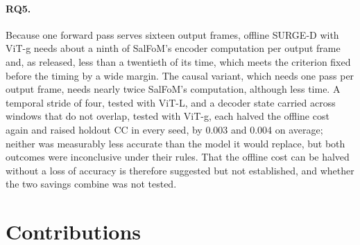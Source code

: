 \paragraph{RQ5.} Because one forward pass serves sixteen output frames,
offline SURGE-D with \acrshort{ViT}-g needs about a ninth of SalFoM's encoder
computation per output frame and, as released, less than a twentieth of its
time, which meets the criterion fixed before the timing by a wide margin. The
causal variant, which needs one pass per output frame, needs nearly twice
SalFoM's computation, although less time. A temporal stride of four, tested
with \acrshort{ViT}-L, and a decoder state carried across windows that do not
overlap, tested with \acrshort{ViT}-g, each halved the offline cost again and
raised holdout \acrshort{CC} in every seed, by 0.003 and 0.004 on average;
neither was measurably less accurate than the model it would replace, but both
outcomes were inconclusive under their rules. That the offline cost can be
halved without a loss of accuracy is therefore suggested but not established,
and whether the two savings combine was not tested.

\section{Contributions}\label{sec:final-contributions}

